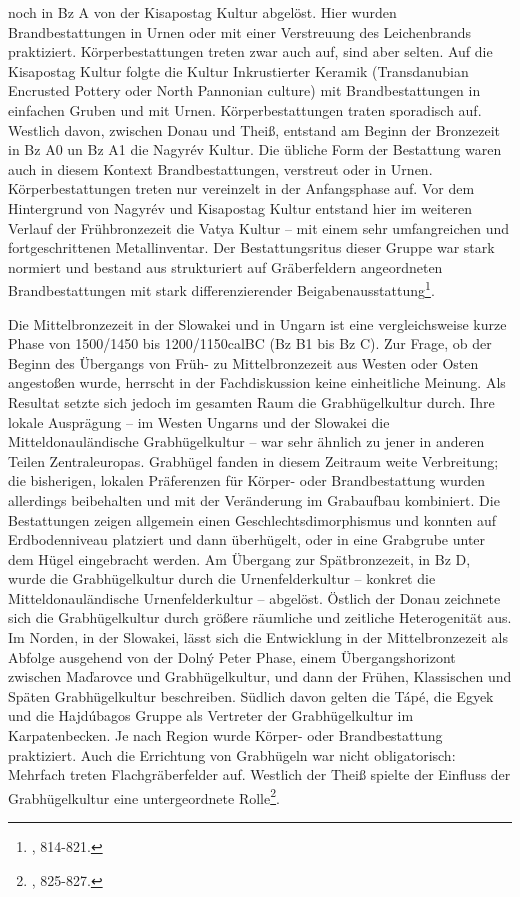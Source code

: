 \documentclass[openany,twoside,twocolumn]{book}
\let\rmarkdownfootnote\footnote%
\def\footnote{\protect\rmarkdownfootnote}
\begin{document}
noch in Bz A von der Kisapostag Kultur abgelöst. Hier wurden Brandbestattungen in Urnen oder mit einer Verstreuung des Leichenbrands praktiziert. Körperbestattungen treten zwar auch auf, sind aber selten. Auf die Kisapostag Kultur folgte die Kultur Inkrustierter Keramik (Transdanubian Encrusted Pottery oder North Pannonian culture) mit Brandbestattungen in einfachen Gruben und mit Urnen. Körperbestattungen traten sporadisch auf. Westlich davon, zwischen Donau und Theiß, entstand am Beginn der Bronzezeit in Bz A0 un Bz A1 die Nagyrév Kultur. Die übliche Form der Bestattung waren auch in diesem Kontext Brandbestattungen, verstreut oder in Urnen. Körperbestattungen treten nur vereinzelt in der Anfangsphase auf. Vor dem Hintergrund von Nagyrév und Kisapostag Kultur entstand hier im weiteren Verlauf der Frühbronzezeit die Vatya Kultur -- mit einem sehr umfangreichen und fortgeschrittenen Metallinventar. Der Bestattungsritus dieser Gruppe war stark normiert und bestand aus strukturiert auf Gräberfeldern angeordneten Brandbestattungen mit stark differenzierender Beigabenausstattung\footnote{\textcite{markova_slovakia_2013}, 814-821.}.

Die Mittelbronzezeit in der Slowakei und in Ungarn ist eine vergleichsweise kurze Phase von 1500/1450 bis 1200/1150calBC (Bz B1 bis Bz C). Zur Frage, ob der Beginn des Übergangs von Früh- zu Mittelbronzezeit aus Westen oder Osten angestoßen wurde, herrscht in der Fachdiskussion keine einheitliche Meinung. Als Resultat setzte sich jedoch im gesamten Raum die Grabhügelkultur durch. Ihre lokale Ausprägung -- im Westen Ungarns und der Slowakei die Mitteldonauländische Grabhügelkultur -- war sehr ähnlich zu jener in anderen Teilen Zentraleuropas. Grabhügel fanden in diesem Zeitraum weite Verbreitung; die bisherigen, lokalen Präferenzen für Körper- oder Brandbestattung wurden allerdings beibehalten und mit der Veränderung im Grabaufbau kombiniert. Die Bestattungen zeigen allgemein einen Geschlechtsdimorphismus und konnten auf Erdbodenniveau platziert und dann überhügelt, oder in eine Grabgrube unter dem Hügel eingebracht werden. Am Übergang zur Spätbronzezeit, in Bz D, wurde die Grabhügelkultur durch die Urnenfelderkultur -- konkret die Mitteldonauländische Urnenfelderkultur -- abgelöst. Östlich der Donau zeichnete sich die Grabhügelkultur durch größere räumliche und zeitliche Heterogenität aus. Im Norden, in der Slowakei, lässt sich die Entwicklung in der Mittelbronzezeit als Abfolge ausgehend von der Dolný Peter Phase, einem Übergangshorizont zwischen Maďarovce und Grabhügelkultur, und dann der Frühen, Klassischen und Späten Grabhügelkultur beschreiben. Südlich davon gelten die Tápé, die Egyek und die Hajdúbagos Gruppe als Vertreter der Grabhügelkultur im Karpatenbecken. Je nach Region wurde Körper- oder Brandbestattung praktiziert. Auch die Errichtung von Grabhügeln war nicht obligatorisch: Mehrfach treten Flachgräberfelder auf. Westlich der Theiß spielte der Einfluss der Grabhügelkultur eine untergeordnete Rolle\footnote{\textcite{markova_slovakia_2013}, 825-827.}.
\end{document}
